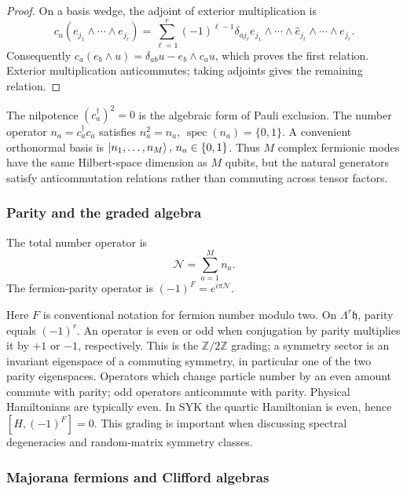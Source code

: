 \documentclass[11pt]{article}
\numberwithin{equation}{section}
\theoremstyle{exposition}
\theoremstyle{result}
\begin{document}
\begin{proof}
On a basis wedge, the adjoint of exterior multiplication is
\begin{equation*}
c_a(e_{j_1}\wedge\cdots\wedge e_{j_r})
=\sum_{\ell=1}^r(-1)^{\ell-1}\delta_{a j_\ell}
e_{j_1}\wedge\cdots\wedge\widehat e_{j_\ell}\wedge\cdots\wedge e_{j_r}.
\end{equation*}
Consequently $c_a(e_b\wedge u)=\delta_{ab}u-e_b\wedge c_a u$, which proves the first relation. Exterior multiplication anticommutes; taking adjoints gives the remaining relation.
\end{proof}

The nilpotence $(c_a^\dagger)^2=0$ is the algebraic form of Pauli exclusion. The number operator $n_a=c_a^\dagger c_a$ satisfies $n_a^2=n_a, \, \operatorname{spec}(n_a)=\{0,1\}$. A convenient orthonormal basis is $\ket{n_1,\ldots,n_M}, \, n_a\in\{0,1\}$. Thus $M$ complex fermionic modes have the same Hilbert-space dimension as $M$ qubits, but the natural generators satisfy anticommutation relations rather than commuting across tensor factors.

\subsubsection{Parity and the graded algebra}

The total number operator is
\begin{equation*}
\mathcal N=\sum_{a=1}^{M}n_a.
\end{equation*}
The fermion-parity operator is $(-1)^F=e^{i\pi\mathcal N}$.


Here $F$ is conventional notation for fermion number modulo two. On $\Lambda^r\mathfrak h$, parity equals $(-1)^r$. An operator is even or odd when conjugation by parity multiplies it by $+1$ or $-1$, respectively. This is the $\mathbb Z/2\mathbb Z$ grading; a symmetry sector is an invariant eigenspace of a commuting symmetry, in particular one of the two parity eigenspaces. Operators which change particle number by an even amount commute with parity; odd operators anticommute with parity. Physical Hamiltonians are typically even. In SYK the quartic Hamiltonian is even, hence $[H,(-1)^F]=0$. This grading is important when discussing spectral degeneracies and random-matrix symmetry classes.

\subsubsection{Majorana fermions and Clifford algebras}
\end{document}
